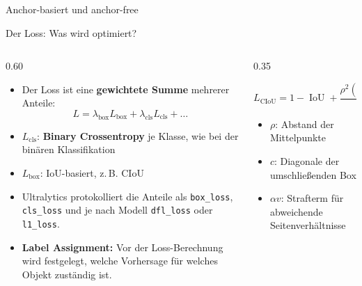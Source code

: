 \begin{frame}{Anchor-basiert und anchor-free}

\end{frame}

\begin{frame}{Der Loss: Was wird optimiert?}
\footnotesize
{}
\begin{columns}
\begin{column}{0.60\textwidth}
\begin{itemize}
  \item Der Loss ist eine \textbf{gewichtete Summe} mehrerer Anteile:
  \[
  L = \lambda_{\text{box}} L_{\text{box}} + \lambda_{\text{cls}} L_{\text{cls}} + \dots
  \]
  \item $L_{\text{cls}}$: \textbf{Binary Crossentropy} je Klasse, wie bei der binären Klassifikation
  \item $L_{\text{box}}$: IoU-basiert, z.\,B. CIoU
  \item Ultralytics protokolliert die Anteile als \texttt{box\_loss}, \texttt{cls\_loss} und je nach Modell \texttt{dfl\_loss} oder \texttt{l1\_loss}.
  \item \textbf{Label Assignment:} Vor der Loss-Berechnung wird festgelegt, welche Vorhersage für welches Objekt zuständig ist.
\end{itemize}
\end{column}
\begin{column}{0.35\textwidth}
\begin{definition}
\[
L_{\text{CIoU}} = 1 - \operatorname{IoU} + \frac{\rho^2(\mathbf{b}, \mathbf{b}^{\text{gt}})}{c^2} + \alpha v
\]
\end{definition}
\begin{itemize}
  \item $\rho$: Abstand der Mittelpunkte
  \item $c$: Diagonale der umschließenden Box
  \item $\alpha v$: Strafterm für abweichende Seitenverhältnisse
\end{itemize}
\end{column}
\end{columns}
\end{frame}

